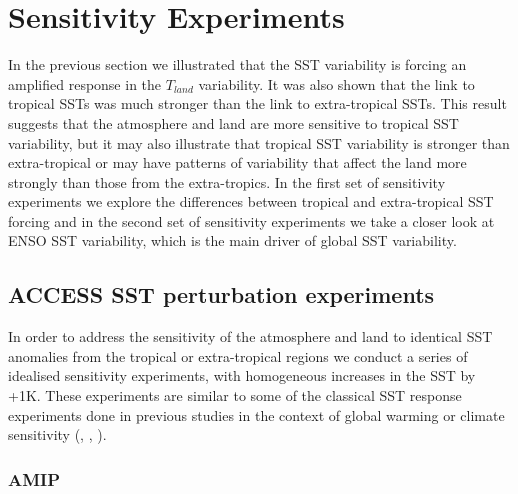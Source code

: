 \chapter{Sensitivity Experiments} 

\label{experiments} 


In the previous section we illustrated that the SST variability is forcing an 
amplified response in the $T_{land}$ variability. It was also shown that the 
link to tropical SSTs was much stronger than the link to extra-tropical SSTs.  
This result suggests that the atmosphere and land are more sensitive to tropical 
SST variability, but it may also illustrate that tropical SST variability is 
stronger than extra-tropical or may have patterns of variability that affect the 
land more strongly than those from the extra-tropics. In the first set of 
sensitivity experiments we explore the differences between tropical and 
extra-tropical SST forcing and in the second set of sensitivity experiments we 
take a closer look at ENSO SST variability, which is the main driver of global 
SST variability.


\section{ACCESS SST perturbation experiments}

In order to address the sensitivity of the atmosphere and land to identical SST 
anomalies from the tropical or extra-tropical regions we conduct a series of 
idealised sensitivity experiments, with homogeneous increases in the SST by +1K. 
These experiments are similar to some of the classical SST response experiments 
done in previous studies in the context of global warming or climate sensitivity 
(\citealt{Cess1990}, \citealt{Dommenget2009}, \citealt{Compo2008}).

\subsection{AMIP}

